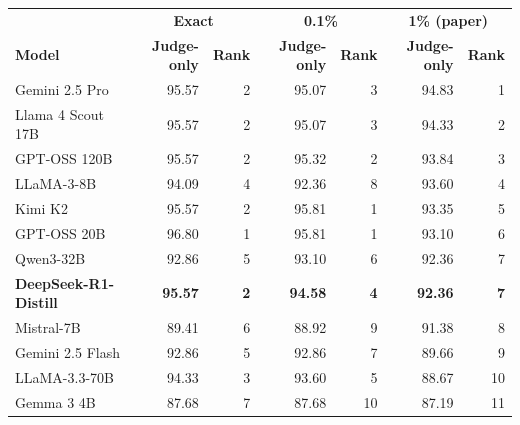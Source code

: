 \begin{tabular}{lrrrrrr}
\toprule
 & \multicolumn{2}{c}{\textbf{Exact}} & \multicolumn{2}{c}{\textbf{0.1\%}} & \multicolumn{2}{c}{\textbf{1\% (paper)}} \\
\textbf{Model} & \textbf{Judge-only} & \textbf{Rank} & \textbf{Judge-only} & \textbf{Rank} & \textbf{Judge-only} & \textbf{Rank} \\
\midrule
Gemini 2.5 Pro & 95.57 & 2 & 95.07 & 3 & 94.83 & 1 \\
Llama 4 Scout 17B & 95.57 & 2 & 95.07 & 3 & 94.33 & 2 \\
GPT-OSS 120B & 95.57 & 2 & 95.32 & 2 & 93.84 & 3 \\
LLaMA-3-8B & 94.09 & 4 & 92.36 & 8 & 93.60 & 4 \\
Kimi K2 & 95.57 & 2 & 95.81 & 1 & 93.35 & 5 \\
GPT-OSS 20B & 96.80 & 1 & 95.81 & 1 & 93.10 & 6 \\
Qwen3-32B & 92.86 & 5 & 93.10 & 6 & 92.36 & 7 \\
\textbf{DeepSeek-R1-Distill} & \textbf{95.57} & \textbf{2} & \textbf{94.58} & \textbf{4} & \textbf{92.36} & \textbf{7} \\
Mistral-7B & 89.41 & 6 & 88.92 & 9 & 91.38 & 8 \\
Gemini 2.5 Flash & 92.86 & 5 & 92.86 & 7 & 89.66 & 9 \\
LLaMA-3.3-70B & 94.33 & 3 & 93.60 & 5 & 88.67 & 10 \\
Gemma 3 4B & 87.68 & 7 & 87.68 & 10 & 87.19 & 11 \\
\bottomrule
\end{tabular}
